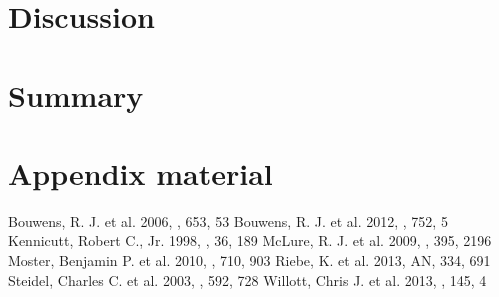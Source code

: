 \documentclass[manuscript]{aastex}
\begin{document}
\section{Discussion}



\section{Summary}


\acknowledgments
%
\appendix

\section{Appendix material}

\begin{thebibliography}{}
 Bouwens, R. J. et al. 2006, \apj, 653, 53			%
 Bouwens, R. J. et al. 2012, \apj, 752, 5 			%
 Kennicutt, Robert C., Jr. 1998, \araa, 36, 189		%
 McLure, R. J. et al. 2009, \mnras, 395, 2196			%
 Moster, Benjamin P. et al. 2010, \apj, 710, 903 
 Riebe, K. et al. 2013, AN, 334, 691 				%
 Steidel, Charles C. et al. 2003, \apj, 592, 728 		%
 Willott, Chris J. et al. 2013, \aj, 145, 4			%


\end{thebibliography}
\end{document}
